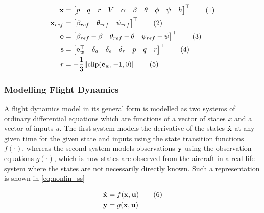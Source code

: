 \documentclass[../report.tex]{subfiles}
\begin{document}
{\myfont
\begin{align*}
    \bold{x} &= \begin{bmatrix} p & q & r & V & \alpha & \beta & \theta & \phi & \psi & h \end{bmatrix}^{\top} \stepcounter{equation}\tag{\theequation}\label{eq:killian_ac_states} \\
    \bold{x}_{ref} &= \begin{bmatrix} \beta_{ref} & \theta_{ref} & \psi_{ref} \end{bmatrix}^{\top} \stepcounter{equation}\tag{\theequation}\label{eq:killian_ref_states} \\
    \bold{e} &= \begin{bmatrix} \beta_{ref} - \beta & \theta_{ref} - \theta & \psi_{ref} - \psi \end{bmatrix}^{\top} \stepcounter{equation}\tag{\theequation}\label{eq:killian_err_vec} \\
    \bold{s} &= \begin{bmatrix} \bold{e}_{w}^{\top} & \delta_a & \delta_e & \delta_r & p & q & r\end{bmatrix}^{\top} \stepcounter{equation}\tag{\theequation}\label{eq:killian_mdp_states} \\
    r &= -\frac{1}{3}\| \text{clip}(\bold{e}_w, -1, 0) \| \stepcounter{equation}\tag{\theequation}\label{eq:killian_mdp_reward} \\
\end{align*}
}

\subsubsection{Modelling Flight Dynamics}


A flight dynamics model in its general form is modelled as two systems of ordinary differential equations which are functions of a vector of states $x$ and a vector of inputs $u$. The first system models the derivative of the states $\dot{\bold{x}}$ at any given time for the given state and inputs using the state transition functions $f(\cdot)$, whereas the second system models observations $\bold{y}$ using the observation equations $g(\cdot)$, which is how states are observed from the aircraft in a real-life system where the states are not necessarily directly known. Such a representation is shown in \autoref{eq:nonlin_ss}

\begin{align*}
    \dot{\bold{x}} &= f(\bold{x, u}) \stepcounter{equation}\tag{\theequation}\label{eq:nonlin_ss}\\
    \bold{y} &= g(\bold{x, u}) 
\end{align*}
\end{document}
